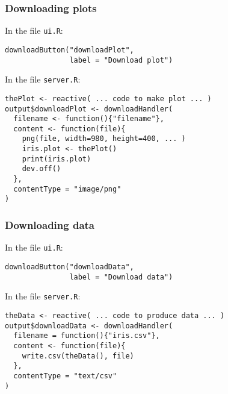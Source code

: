 \documentclass{beamer}
\begin{document}
	\begin{frame}[fragile]
		\frametitle{Downloading plots}

		In the file \verb|ui.R|:
		
		\begin{exampleblock}{}
		\begin{BVerbatim}
downloadButton("downloadPlot",
               label = "Download plot")
		\end{BVerbatim}
		\end{exampleblock}{}

		In the file \verb|server.R|:
		
		\begin{exampleblock}{}
		\begin{BVerbatim}
thePlot <- reactive( ... code to make plot ... )
output$downloadPlot <- downloadHandler(
  filename <- function(){"filename"},
  content <- function(file){
    png(file, width=980, height=400, ... )
    iris.plot <- thePlot()
    print(iris.plot)
    dev.off()
  },
  contentType = "image/png"
)
		\end{BVerbatim}
		\end{exampleblock}{}

	\end{frame}

	\begin{frame}[fragile]
		\frametitle{Downloading data}

		In the file \verb|ui.R|:
		
		\begin{exampleblock}{}
		\begin{BVerbatim}
downloadButton("downloadData",
               label = "Download data")
		\end{BVerbatim}
		\end{exampleblock}{}

		\vspace{1em}

		In the file \verb|server.R|:
		
		\begin{exampleblock}{}
		\begin{BVerbatim}
theData <- reactive( ... code to produce data ... )
output$downloadData <- downloadHandler(
  filename = function(){"iris.csv"},
  content <- function(file){
    write.csv(theData(), file)
  },
  contentType = "text/csv"
)
		\end{BVerbatim}
		\end{exampleblock}{}

	\end{frame}
\end{document}
